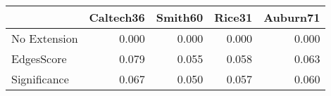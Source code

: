 \begin{tabular}{lrrrr}
\toprule
{} & Caltech36 & Smith60 & Rice31 & Auburn71 \\
\midrule
No Extension &     0.000 &   0.000 &  0.000 &    0.000 \\
EdgesScore   &     0.079 &   0.055 &  0.058 &    0.063 \\
Significance &     0.067 &   0.050 &  0.057 &    0.060 \\
\bottomrule
\end{tabular}
